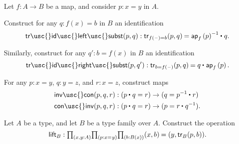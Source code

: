 \begin{exercises}
\item \label{ex:trans_ap}Let $f:A\to B$ be a map, and consider $p:x=y$ in $A$. 
\begin{subexenum}
\item Construct for any $q:f(x)=b$ in $B$ an identification
\begin{equation*}
\mathsf{tr\usc{}id\usc{}left\usc{}subst}(p,q):\id{\mathsf{tr}_{f(\blank)=b}(p,q)}{\ct{\ap{f}{p}^{-1}}{q}}.
\end{equation*}
\item Similarly, construct for any $q':b=f(x)$ in $B$ an identification
\begin{equation*}
\mathsf{tr\usc{}id\usc{}right\usc{}subst}(p,q'):\id{\mathsf{tr}_{b=f(\blank)}(p,q)}{\ct{q}{\ap{f}{p}}}.
\end{equation*}
\end{subexenum}
\item \label{ex:inv_con}For any $p:x=y$, $q:y=z$, and $r:x=z$, construct maps
\begin{align*}
\mathsf{inv\usc{}con}(p,q,r) & : (\ct{p}{q}=r)\to (q=\ct{p^{-1}}{r}) \\
\mathsf{con\usc{}inv}(p,q,r) & : (\ct{p}{q}=r)\to (p=\ct{r}{q^{-1}}).
\end{align*}
\item Let $A$ be a type, and let $B$ be a type family over $A$.
Construct the  operation
\begin{equation*}
\mathsf{lift}_B : \prd*{x,y:A}{p:\id{x}{y}}{b:B(x)} \id{\pairr{x,b}}{\pairr{y,\mathsf{tr}_B(p,b)}}.

\end{equation*}
\end{exercises}
